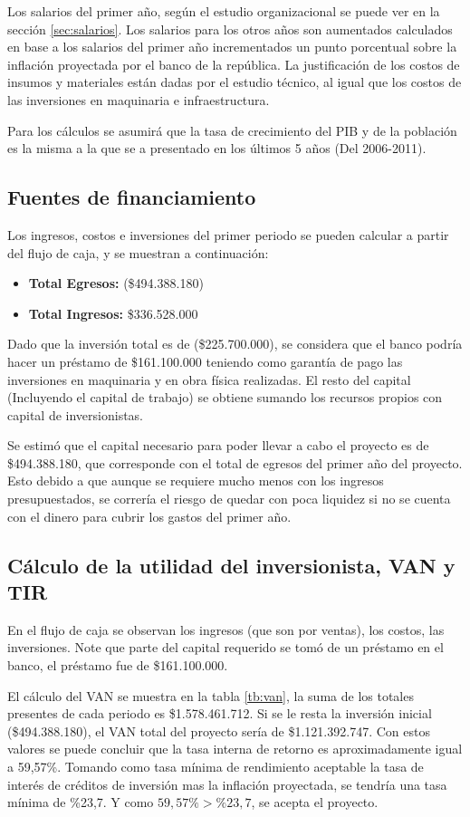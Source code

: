 \documentclass[a4paper, 12pt, oneside]{article}
\begin{document}
	Los salarios del primer año, según el estudio organizacional se puede ver en la sección \ref{sec:salarios}.
	Los salarios para los otros años son aumentados calculados en base a los salarios del primer año incrementados un punto porcentual sobre la inflación proyectada por el banco de la república. La justificación de los costos de insumos y materiales están dadas por el estudio técnico, al igual que los costos de las inversiones en maquinaria e infraestructura.
	
	Para los cálculos se asumirá que la tasa de crecimiento del PIB y de la población es la misma a la que se a presentado en los últimos 5 años (Del 2006-2011).
	
	\subsection{Fuentes de financiamiento}
	Los ingresos, costos e inversiones del primer periodo se pueden calcular a partir del flujo de caja, y se muestran a continuación:
	\begin{itemize}
		\item {\bf Total Egresos:} (\$494.388.180)
		\item {\bf Total Ingresos: } \$336.528.000
	\end{itemize}
	Dado que la inversión total es de (\$225.700.000), se considera que el banco podría hacer un préstamo de \$161.100.000 teniendo como garantía de pago las inversiones en maquinaria y en obra física realizadas. El resto del capital (Incluyendo el capital de trabajo) se obtiene sumando los recursos propios con capital de inversionistas.
	
	Se estimó que el capital necesario para poder llevar a cabo el proyecto es de \$494.388.180, que corresponde con el total de egresos del primer año del proyecto. Esto debido a que aunque se requiere mucho menos con los ingresos presupuestados, se correría el riesgo de quedar con poca liquidez si no se cuenta con el dinero para cubrir los gastos del primer año.
	
	\subsection{Cálculo de la utilidad del inversionista, VAN y TIR}
	En el flujo de caja se observan los ingresos (que son por ventas), los costos, las inversiones. Note que parte del capital requerido se tomó de un préstamo en el banco, el préstamo fue de \$161.100.000. 
	
	El cálculo del VAN se muestra en la tabla \ref{tb:van}, la suma de los totales presentes de cada periodo es \$1.578.461.712. Si se le resta la inversión inicial (\$494.388.180), el VAN total del proyecto sería de \$1.121.392.747. Con estos valores se puede concluir que la tasa interna de retorno es aproximadamente igual a 59,57\%. Tomando como tasa mínima de rendimiento aceptable la tasa de interés de créditos de inversión mas la inflación proyectada, se tendría una tasa mínima de \%23,7. Y como $59,57\% > \%23,7$, se acepta el proyecto.
	
\end{document}
